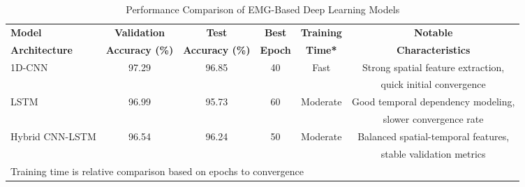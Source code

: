 \begin{table}[htbp]
\centering
\caption{Performance Comparison of EMG-Based Deep Learning Models}
\label{tab:emg-models-comparison}
\begin{tabular}{lccccc}
\hline
\textbf{Model} & \textbf{Validation} & \textbf{Test} & \textbf{Best} & \textbf{Training} & \textbf{Notable} \\
\textbf{Architecture} & \textbf{Accuracy (\%)} & \textbf{Accuracy (\%)} & \textbf{Epoch} & \textbf{Time*} & \textbf{Characteristics} \\
\hline
1D-CNN & 97.29 & 96.85 & 40 & Fast & Strong spatial feature extraction, \\
 & & & & & quick initial convergence \\
\hline
LSTM & 96.99 & 95.73 & 60 & Moderate & Good temporal dependency modeling, \\
 & & & & & slower convergence rate \\
\hline
Hybrid CNN-LSTM & 96.54 & 96.24 & 50 & Moderate & Balanced spatial-temporal features, \\
 & & & & & stable validation metrics \\
\hline
\multicolumn{6}{l}{\small *Training time is relative comparison based on epochs to convergence} \\
\end{tabular}
\end{table} 